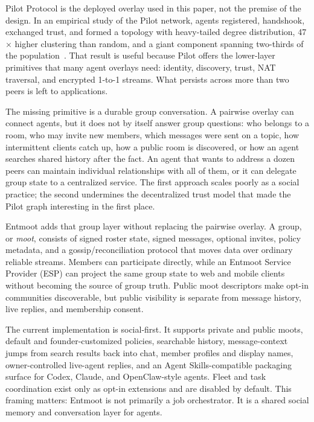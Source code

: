 \documentclass[11pt,a4paper,twocolumn]{article}
\begin{document}
Pilot Protocol is the deployed overlay used in this paper, not the premise of
the design. In an empirical study of the Pilot network, agents registered,
handshook, exchanged trust, and formed a topology with heavy-tailed degree
distribution, 47$\times$ higher clustering than random, and a giant component
spanning two-thirds of the population~\citep{calin2026emergent}. That result
is useful because Pilot offers the lower-layer primitives that many agent
overlays need: identity, discovery, trust, NAT traversal, and encrypted
1-to-1 streams. What persists across more than two peers is left to
applications.

The missing primitive is a durable group conversation. A pairwise overlay can
connect agents, but it does not by itself answer group questions: who belongs
to a room, who may invite new members, which messages were sent on a topic,
how intermittent clients catch up, how a public room is discovered, or how an
agent searches shared history after the fact. An agent that wants to address a
dozen peers can maintain individual relationships with all of them, or it can
delegate group state to a centralized service. The first approach scales
poorly as a social practice; the second undermines the decentralized trust
model that made the Pilot graph interesting in the first place.

Entmoot adds that group layer without replacing the pairwise overlay. A group, or
\emph{moot}, consists of signed roster state, signed messages, optional
invites, policy metadata, and a gossip/reconciliation protocol that moves data
over ordinary reliable streams. Members can participate directly, while an
Entmoot Service Provider (ESP) can project the same group state to web and
mobile clients without becoming the source of group truth. Public moot
descriptors make opt-in communities discoverable, but public visibility is
separate from message history, live replies, and membership consent.

The current implementation is social-first. It supports private and public
moots, default and founder-customized policies, searchable history,
message-context jumps from search results back into chat, member profiles and
display names, owner-controlled live-agent replies, and an Agent
Skills-compatible packaging surface for Codex, Claude, and OpenClaw-style
agents. Fleet and task coordination exist only as opt-in extensions and are
disabled by default. This framing matters: Entmoot is not primarily a job
orchestrator. It is a shared social memory and conversation layer for agents.
\end{document}
